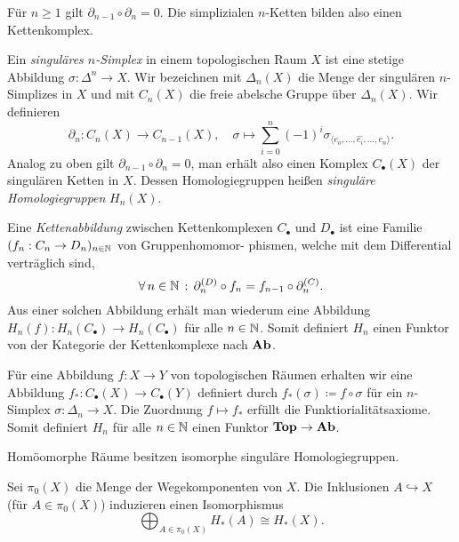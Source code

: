 \documentclass{cheat-sheet}
\newcommand{\angles}[1]{{\langle #1 \rangle}}
\newcommand{\CC}[1]{{#1}_{\bullet}} %
\begin{document}
\begin{prop}
  Für $n \geq 1$ gilt $\partial_{n-1} \circ \partial_n = 0$. Die simplizialen $n$-Ketten bilden also einen Kettenkomplex.
\end{prop}

\begin{defn}
  Ein \emph{singuläres $n$-Simplex} in einem topologischen Raum $X$ ist eine stetige Abbildung $\sigma : \Delta^n \to X$. Wir bezeichnen mit $\Delta_n(X)$ die Menge der singulären $n$-Simplizes in $X$ und mit $C_n(X)$ die freie abelsche Gruppe über $\Delta_n(X)$. Wir definieren
  \[
    \partial_n : C_n(X) \to C_{n-1}(X), \quad
    \sigma \mapsto \sum_{i=0}^n (-1)^i \sigma_{\angles{e_o,\ldots,\hat{e_i},\ldots,e_n}}.
  \]
  Analog zu oben gilt $\partial_{n-1} \circ \partial_n = 0$, man erhält also einen Komplex $\CC{C}(X)$ der singulären Ketten in $X$. Dessen Homologiegruppen heißen \emph{singuläre Homologiegruppen} $H_n(X)$.
\end{defn}

\begin{defn}
  Eine \emph{Kettenabbildung} zwischen Kettenkomplexen $\CC{C}$ und $\CC{D}$ ist eine Familie $(f_n : C_n \to D_n)_{n \in \mathbb{N}}$ von Gruppenhomomor- phismen, welche mit dem Differential verträglich sind, \dh{}
  \[ \forall \, {n \in \mathbb{N}} \,:\, \partial_n^{(D)} \circ f_n = f_{n-1} \circ \partial_n^{(C)}. \]
  Aus einer solchen Abbildung erhält man wiederum eine Abbildung $H_n(f) : H_n(\CC{C}) \to H_n(\CC{C})$ für alle $n \in \mathbb{N}$. Somit definiert $H_n$ einen Funktor von der Kategorie der Kettenkomplexe nach $\mathbf{Ab}$.
\end{defn}


\begin{defn}
  Für eine Abbildung $f : X \to Y$ von topologischen Räumen erhalten wir eine Abbildung $f_* : \CC{C}(X) \to \CC{C}(Y)$ definiert durch $f_*(\sigma) \coloneqq f \circ \sigma$ für ein $n$-Simplex $\sigma : \Delta_n \to X$. Die Zuordnung $f \mapsto f_*$ erfüllt die Funktiorialitätsaxiome. Somit definiert $H_n$ für alle $n \in \mathbb{N}$ einen Funktor $\mathbf{Top} \to \mathbf{Ab}$.
\end{defn}

\begin{kor}
  Homöomorphe Räume besitzen isomorphe singuläre Homologiegruppen.
\end{kor}


\begin{prop}
  Sei $\pi_0(X)$ die Menge der Wegekomponenten von $X$. Die Inklusionen $A \hookrightarrow X$ (für $A \in \pi_0(X)$) induzieren einen Isomorphismus
  \[ \bigoplus_{A \in \pi_0(X)} H_*(A) \cong H_*(X). \]
\end{prop}
\end{document}
